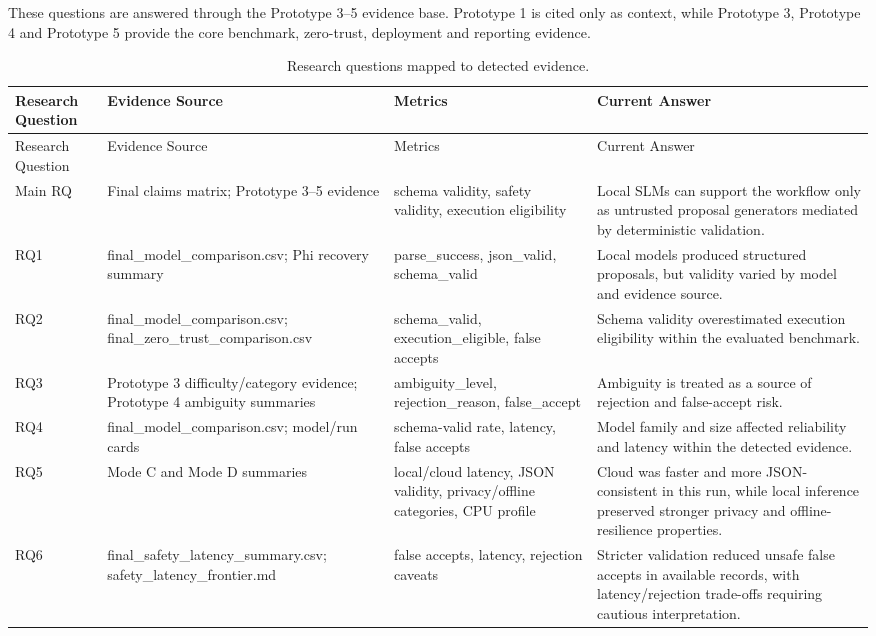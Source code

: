 These questions are answered through the Prototype 3--5 evidence base. Prototype 1 is cited only as context, while Prototype 3, Prototype 4 and Prototype 5 provide the core benchmark, zero-trust, deployment and reporting evidence.

\begin{longtable}{p{}p{}p{}p{}}
        \caption{Research questions mapped to detected evidence.}
        \label{tab:rq_to_evidence}\\
        \toprule
        Research Question & Evidence Source & Metrics & Current Answer \\
        \midrule
        \endfirsthead
        \toprule
        Research Question & Evidence Source & Metrics & Current Answer \\
        \midrule
        \endhead
        Main RQ & Final claims matrix; Prototype 3--5 evidence & schema validity, safety validity, execution eligibility & Local SLMs can support the workflow only as untrusted proposal generators mediated by deterministic validation. \\
RQ1 & final\_model\_comparison.csv; Phi recovery summary & parse\_success, json\_valid, schema\_valid & Local models produced structured proposals, but validity varied by model and evidence source. \\
RQ2 & final\_model\_comparison.csv; final\_zero\_trust\_comparison.csv & schema\_valid, execution\_eligible, false accepts & Schema validity overestimated execution eligibility within the evaluated benchmark. \\
RQ3 & Prototype 3 difficulty/category evidence; Prototype 4 ambiguity summaries & ambiguity\_level, rejection\_reason, false\_accept & Ambiguity is treated as a source of rejection and false-accept risk. \\
RQ4 & final\_model\_comparison.csv; model/run cards & schema-valid rate, latency, false accepts & Model family and size affected reliability and latency within the detected evidence. \\
RQ5 & Mode C and Mode D summaries & local/cloud latency, JSON validity, privacy/offline categories, CPU profile & Cloud was faster and more JSON-consistent in this run, while local inference preserved stronger privacy and offline-resilience properties. \\
RQ6 & final\_safety\_latency\_summary.csv; safety\_latency\_frontier.md & false accepts, latency, rejection caveats & Stricter validation reduced unsafe false accepts in available records, with latency/rejection trade-offs requiring cautious interpretation. \\
        \bottomrule
        \end{longtable}
